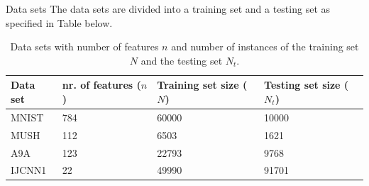 \documentclass{beamer}
\begin{document}
\begin{frame}{Data sets}
    The data sets are divided into a training set and a testing set as specified in Table below.
\begin{table}[h!]
    \centering
    \begin{tabular}{llll}
    Data set        & nr. of features ($n$)   & Training set size ($N$)& Testing set size ($N_t$) \\ \hline
    MNIST  & 784                     & 60000                  & 10000 \\
MUSH  & 112                     & 6503                   & 1621\\
    A9A    & 123                     & 22793                  & 9768\\
    IJCNN1 & 22                      & 49990                  & 91701\\
    \end{tabular}
    \caption{Data sets with number of features $n$ and number of instances of the training set $N$ and the testing set $N_t$.}
    \label{tab: datasets}
\end{table}
\end{frame}



			
\end{document}
